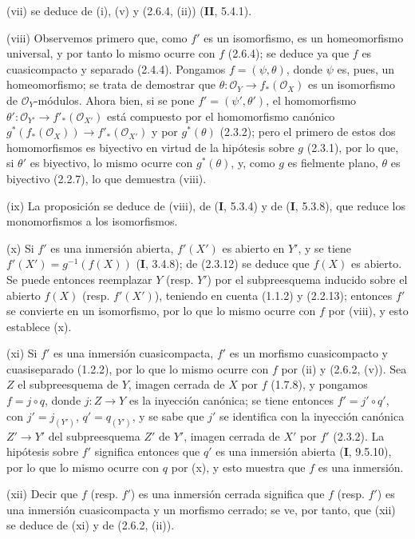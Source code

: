 (vii) se deduce de (i), (v) y (2.6.4, (ii)) (\textbf{II}, 5.4.1).

(viii) Observemos primero que, como $f'$ es un isomorfismo, es un
homeomorfismo universal, y por tanto lo mismo ocurre con $f$ (2.6.4); se
deduce ya que $f$ es cuasicompacto y separado (2.4.4). Pongamos
$f=(\psi,\theta)$, donde $\psi$ es, pues, un homeomorfismo; se trata de
demostrar que
$\theta:\mathcal O_Y\to f_*(\mathcal O_X)$
es un isomorfismo de $\mathcal O_Y$-módulos. Ahora bien, si se pone
$f'=(\psi',\theta')$, el homomorfismo
$\theta':\mathcal O_{Y'}\to f'_*(\mathcal O_{X'})$ está compuesto por el
homomorfismo canónico
$g^*(f_*(\mathcal O_X))\to f'_*(\mathcal O_{X'})$ y por $g^*(\theta)$
(2.3.2); pero el primero de estos dos homomorfismos es biyectivo en virtud de
la hipótesis sobre $g$ (2.3.1), por lo que, si $\theta'$ es biyectivo,
lo mismo ocurre con $g^*(\theta)$, y, como $g$ es fielmente plano, $\theta$ es
biyectivo (2.2.7), lo que demuestra (viii).

(ix) La proposición se deduce de (viii), de (\textbf I, 5.3.4) y de (\textbf I, 5.3.8),
que reduce los monomorfismos a los isomorfismos.

(x) Si $f'$ es una inmersión abierta, $f'(X')$ es abierto en $Y'$, y
se tiene $f'(X')=g^{-1}(f(X))$ (\textbf I, 3.4.8); de (2.3.12) se deduce que $f(X)$
es abierto. Se puede entonces reemplazar $Y$ (resp. $Y'$) por el subpreesquema
inducido sobre el abierto $f(X)$ (resp. $f'(X')$), teniendo en cuenta (1.1.2)
y (2.2.13); entonces $f'$ se convierte en un isomorfismo, por lo que lo mismo
ocurre con $f$ por (viii), y esto establece (x).

(xi) Si $f'$ es una inmersión cuasicompacta, $f'$ es un morfismo
cuasicompacto y cuasiseparado (1.2.2), por lo que lo mismo ocurre con $f$ por
(ii) y (2.6.2, (v)). Sea $Z$ el subpreesquema de $Y$, imagen cerrada de $X$
por $f$ (1.7.8), y pongamos $f=j\circ q$, donde $j:Z\to Y$ es la inyección
canónica; se tiene entonces $f'=j'\circ q'$, con $j'=j_{(Y')}$,
$q'=q_{(Y')}$, y se sabe que $j'$ se identifica con la inyección canónica
$Z'\to Y'$ del subpreesquema $Z'$ de $Y'$, imagen cerrada de $X'$ por $f'$
(2.3.2). La hipótesis sobre $f'$ significa entonces que $q'$ es una inmersión
abierta (\textbf I, 9.5.10), por lo que lo mismo ocurre con $q$ por (x), y esto muestra
que $f$ es una inmersión.

(xii) Decir que $f$ (resp. $f'$) es una inmersión cerrada significa que
$f$ (resp. $f'$) es una inmersión cuasicompacta y un morfismo cerrado; se ve,
por tanto, que (xii) se deduce de (xi) y de (2.6.2, (ii)).

